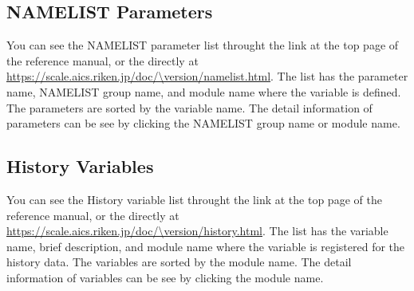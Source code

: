 \subsection{NAMELIST Parameters}
You can see the NAMELIST parameter list throught the link at the top page of the reference manual, or the directly at \url{https://scale.aics.riken.jp/doc/\version/namelist.html}.
The list has the parameter name, NAMELIST group name, and module name where the variable is defined.
The parameters are sorted by the variable name.
The detail information of parameters can be see by clicking the NAMELIST group name or module name.


\subsection{History Variables}
You can see the History variable list throught the link at the top page of the reference manual, or the directly at \url{https://scale.aics.riken.jp/doc/\version/history.html}.
The list has the variable name, brief description, and module name where the variable is registered for the history data.
The variables are sorted by the module name.
The detail information of variables can be see by clicking the module name.
